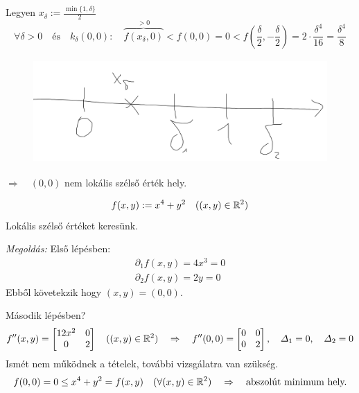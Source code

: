 \documentclass[a4paper,11.5pt]{article}
\begin{document}
\begin{task}
		Legyen $x_\delta:=\frac{\min\{1,\delta\}}{2}$
		\[ \forall\delta>0\quad \text{és}\quad k_\delta(0,0):\quad \overbrace{f(x_\delta,0)}^{>0}<f(0,0)=0<f\left(\frac{\delta}{2},-\frac{\delta}{2}\right)=2\cdot\frac{\delta^4}{16}=\frac{\delta^4}{8} \]
		\begin{figure}[H]
			\centering
			\includegraphics[height=4cm]{../2zh/kepek/44.png}
			\caption{}
		\end{figure}
		$\Rightarrow \quad (0,0)$ nem lokális szélső érték hely.
	\end{task}
	\begin{task}
		\[ f(x,y):=x^4+y^2\quad ((x,y)\in\mathbb{R}^2) \]
		Lokális szélső értéket keresünk.
		
		\textit{Megoldás:} Első lépésben:
		\begin{align*}
			\partial_1f(x,y)=4x^3=0\\
			\partial_2f(x,y)=2y=0
		\end{align*}
		Ebből követekzik hogy $(x,y)=(0,0)$.
		
		Második lépésben?
		\[ f''(x,y)=\begin{bmatrix}
			12x^2&0\\
			0&2
		\end{bmatrix}\quad ((x,y)\in\mathbb{R}^2)\quad \Rightarrow\quad f''(0,0)=\begin{bmatrix}
		0&0\\
		0&2
		\end{bmatrix},\quad \varDelta_1=0,\quad \varDelta_2=0 \]
		Ismét nem működnek a tételek, további vizsgálatra van szükség.
		\[ f(0,0)=0\leq x^4+y^2=f(x,y)\quad (\forall(x,y)\in\mathbb{R}^2)\quad \Rightarrow\quad \text{abszolút minimum hely.} \]
	\end{task}
\end{document}
